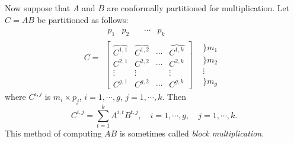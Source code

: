 \documentclass[12pt]{article}
\begin{document}
Now suppose that $A$ and $B$ are conformally partitioned for multiplication.
Let $C=AB$ be partitioned as follows:
$$C=\begin{matrix} 
 \begin{matrix}
p_{1} & p_{2} & \quad \cdots & p_{k}  
\end{matrix}  & 
\begin{matrix}
\quad
\end{matrix} 
\\
\left[ \begin{matrix} 
\overbrace{C^{1,1}} & \overbrace{C^{1,2}} & \cdots & \overbrace{C^{1,k}} \\
C^{2,1} & C^{2,2} & \cdots & C^{2,k} \\
\vdots & \vdots & \ \ & \vdots \\
C^{g,1} & C^{g,2} & \cdots & C^{g,k} 
\end{matrix} \right] & 
\begin{matrix}
\}m_{1} \\
\}m_{2} \\
\vdots \\
\}m_{g} 
\end{matrix}
\end{matrix}
$$
where $C^{i,j}$ is $m_{i} \times p_{j}$, $i=1, \cdots ,g$, $j=1,\cdots ,k$.
Then
$$
C^{i,j} = \sum_{t=1}^{k} A^{i,t}B^{t,j}, \quad i=1,\cdots , g, \quad j=1, \cdots , k.
$$
This method of computing $AB$ is sometimes called {\it block multiplication}.


\end{document}

